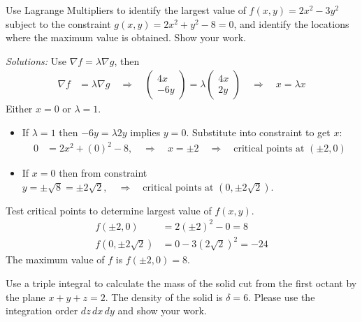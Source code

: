 \fi 


\ifnum {}
    
    \question[4] Use Lagrange Multipliers to identify the largest value of $f(x,y)=2x^2-3y^2$ subject to the constraint $\displaystyle g(x,y) = 2x^2 + y^2 - 8 = 0$, and identify the locations where the maximum value is obtained. Show your work. 

    \ifnum {} {\color{DarkBlue} \textit{Solutions:} Use $\nabla f = \lambda \nabla g $, then 
    \begin{align*}
    \nabla f &= \lambda \nabla g \quad \Rightarrow \quad 
    \begin{pmatrix} 4x\\-6y\end{pmatrix} = \lambda \begin{pmatrix} 4x\\2y\end{pmatrix} \quad \Rightarrow \quad x = \lambda x
    \end{align*}
    Either $x=0$ or $\lambda = 1$. 
    \begin{itemize}
        \item If $\lambda = 1$ then $-6y=\lambda2y$ implies $y=0$. Substitute into constraint to get $x$:
    \begin{align*}
        0&= 2x^2 + (0)^2 - 8, \quad \Rightarrow \quad x= \pm 2 \quad \Rightarrow \quad \text{critical points at } (\pm2,0)
    \end{align*}
    \item If $x=0$ then from constraint $y=\pm \sqrt{8} = \pm 2\sqrt2, \quad \Rightarrow \quad \text{critical points at } (0, \pm2\sqrt2)$. 
    \end{itemize}
    Test critical points to determine largest value of $f(x,y)$. 
    \begin{align}
        f(\pm 2, 0) & = 2(\pm2)^2 - 0 = 8 \\
        f(0,\pm 2\sqrt2) &= 0 -3 (2\sqrt2)^2 = - 24
    \end{align}
    The maximum value of $f$ is $f(\pm2,0) = 8$. 
}
\else 
      \vspace{6cm}
\fi
    
\fi


\ifnum {}
    \question[4] Use a triple integral to calculate the mass of the solid cut from the first octant by the plane $x+y+z=2$. The density of the solid is $\delta = 6$. Please use the integration order $dz\,dx\,dy$ and show your work. 
    

